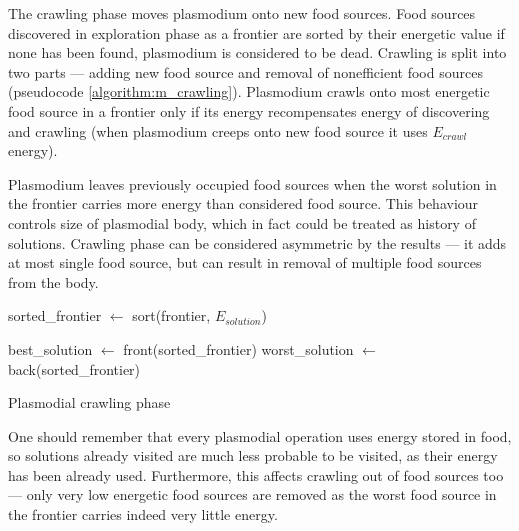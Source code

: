 The crawling phase moves plasmodium onto new food sources. Food sources discovered in exploration phase as a frontier are sorted by their energetic value if none has been found, plasmodium is considered to be dead. Crawling is split into two parts --- adding new food source and removal of nonefficient food sources (pseudocode \ref{algorithm:m_crawling}). Plasmodium crawls onto most energetic food source in a frontier only if its energy recompensates energy of discovering and crawling (when plasmodium creeps onto new food source it uses $E_{crawl}$ energy). 

Plasmodium leaves previously occupied food sources when the worst solution in the frontier carries more energy than considered food source. This behaviour controls size of plasmodial body, which in fact could be treated as history of solutions. Crawling phase can be considered asymmetric by the results --- it adds at most single food source, but can result in removal of multiple food sources from the body.

\begin{algorithm}
  \BlankLine


  sorted\_frontier $\leftarrow$ sort(frontier, $E_{solution}$)\;

  best\_solution $\leftarrow$ front(sorted\_frontier)\;
  worst\_solution $\leftarrow$ back(sorted\_frontier)\;


  \;

  \caption{Plasmodial crawling phase}
  \label{algorithm:m_crawling}
\end{algorithm}

One should remember that every plasmodial operation uses energy stored in food, so solutions already visited are much less probable to be visited, as their energy has been already used. Furthermore, this affects crawling out of food sources too --- only very low energetic food sources are removed as the worst food source in the frontier carries indeed very little energy.


